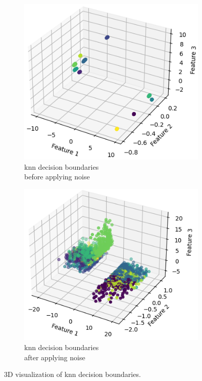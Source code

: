 \documentclass[11pt,
  oneside,openany,    %
]{scrreprt}
\begin{document}
\begin{figure}[h!]
  \centering
  \captionsetup{justification=centering}
  \begin{subfigure}[b]{0.49\textwidth}
    \centering
    \includegraphics[width=\textwidth]{figures/knn_before.png}
    \caption{knn decision boundaries\\before applying noise}
  \end{subfigure}
  \hfill
  \begin{subfigure}[b]{0.49\textwidth}
    \centering
    \includegraphics[width=\textwidth]{figures/knn_after.png}
    \caption{knn decision boundaries\\after applying noise}
  \end{subfigure}
  \caption{3D visualization of knn decision boundaries.}
  \label{fig:knn_decision_boundaries}
\end{figure}
\end{document}
